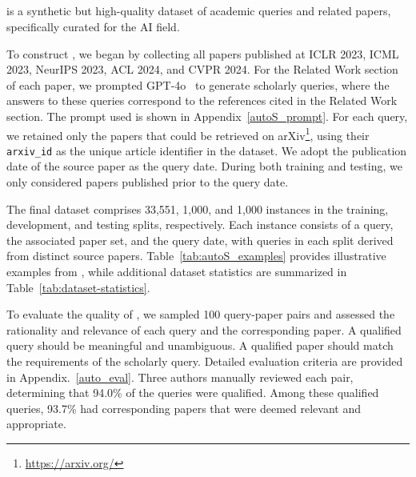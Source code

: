 \subsection{\autoS} \label{sec:AutoScholarQuery}

\autoS is a synthetic but high-quality dataset of academic queries and related papers, specifically curated for the AI field.

To construct \autoS, we began by collecting all papers published at ICLR 2023, ICML 2023, NeurIPS 2023, ACL 2024, and CVPR 2024. For the Related Work section of each paper, we prompted GPT-4o~\cite{hurst2024gpt} to generate scholarly queries, where the answers to these queries correspond to the references cited in the Related Work section. The prompt used is shown in Appendix~\ref{autoS_prompt}. For each query, we retained only the papers that could be retrieved on arXiv\footnote{\url{https://arxiv.org/}}, using their \texttt{arxiv\_id} as the unique article identifier in the dataset. We adopt the publication date of the source paper as the query date. During both training and testing, we only considered papers published prior to the query date.

The final \autoS dataset comprises 33,551, 1,000, and 1,000 instances in the training, development, and testing splits, respectively. Each instance consists of a query, the associated paper set, and the query date, with queries in each split derived from distinct source papers. Table~\ref{tab:autoS_examples} provides illustrative examples from \autoS, while additional dataset statistics are summarized in Table~\ref{tab:dataset-statistics}.

To evaluate the quality of \autoS, we sampled 100 query-paper pairs and assessed the rationality and relevance of each query and the corresponding paper. A qualified query should be meaningful and unambiguous. A qualified paper should match the requirements of the scholarly query. Detailed evaluation criteria are provided in Appendix.~\ref{auto_eval}. Three authors manually reviewed each pair, determining that 94.0\% of the queries were qualified. Among these qualified queries, 93.7\% had corresponding papers that were deemed relevant and appropriate.

